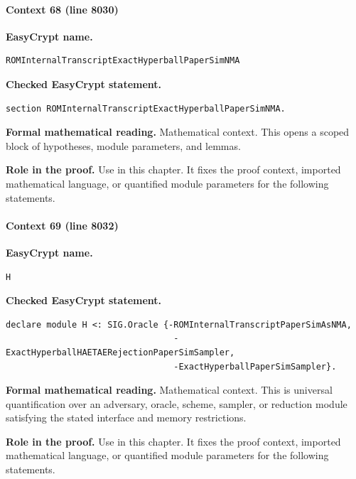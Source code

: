 \paragraph{Context 68 (line 8030)}
\noindent\textbf{EasyCrypt name.}
\begin{lstlisting}[language=EasyCrypt,basicstyle=\ttfamily\scriptsize]
ROMInternalTranscriptExactHyperballPaperSimNMA
\end{lstlisting}
\noindent\textbf{Checked EasyCrypt statement.}
\begin{lstlisting}[language=EasyCrypt,basicstyle=\ttfamily\scriptsize]
section ROMInternalTranscriptExactHyperballPaperSimNMA.
\end{lstlisting}
\noindent\textbf{Formal mathematical reading.}
Mathematical context. This opens a scoped block of hypotheses, module parameters, and lemmas.

\noindent\textbf{Role in the proof.}
Use in this chapter. It fixes the proof context, imported mathematical language, or quantified module parameters for the following statements.

\paragraph{Context 69 (line 8032)}
\noindent\textbf{EasyCrypt name.}
\begin{lstlisting}[language=EasyCrypt,basicstyle=\ttfamily\scriptsize]
H
\end{lstlisting}
\noindent\textbf{Checked EasyCrypt statement.}
\begin{lstlisting}[language=EasyCrypt,basicstyle=\ttfamily\scriptsize]
declare module H <: SIG.Oracle {-ROMInternalTranscriptPaperSimAsNMA,
                                 -ExactHyperballHAETAERejectionPaperSimSampler,
                                 -ExactHyperballPaperSimSampler}.
\end{lstlisting}
\noindent\textbf{Formal mathematical reading.}
Mathematical context. This is universal quantification over an adversary, oracle, scheme, sampler, or reduction module satisfying the stated interface and memory restrictions.

\noindent\textbf{Role in the proof.}
Use in this chapter. It fixes the proof context, imported mathematical language, or quantified module parameters for the following statements.

